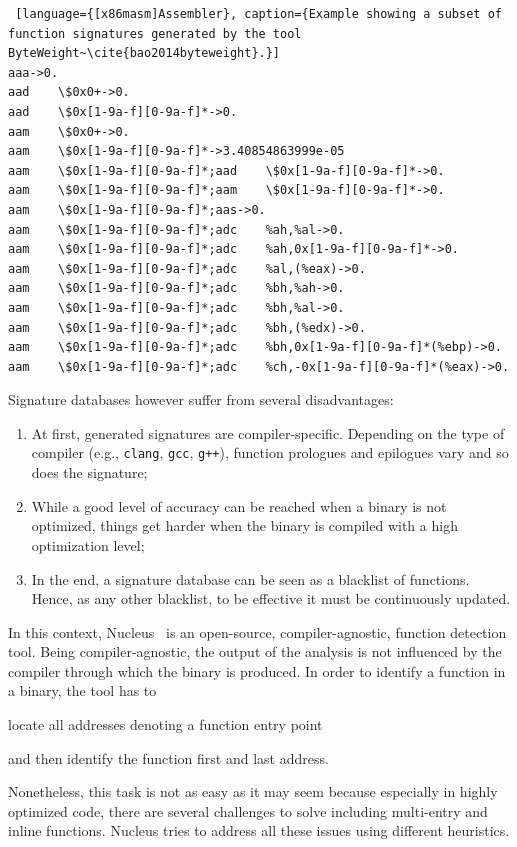 \documentclass[LaM,binding=0.6cm]{sapthesis}
\begin{document}
\begin{lstlisting} [language={[x86masm]Assembler}, caption={Example showing a subset of function signatures generated by the tool ByteWeight~\cite{bao2014byteweight}.}]
aaa->0.
aad    \$0x0+->0.
aad    \$0x[1-9a-f][0-9a-f]*->0.
aam    \$0x0+->0.
aam    \$0x[1-9a-f][0-9a-f]*->3.40854863999e-05
aam    \$0x[1-9a-f][0-9a-f]*;aad    \$0x[1-9a-f][0-9a-f]*->0.
aam    \$0x[1-9a-f][0-9a-f]*;aam    \$0x[1-9a-f][0-9a-f]*->0.
aam    \$0x[1-9a-f][0-9a-f]*;aas->0.
aam    \$0x[1-9a-f][0-9a-f]*;adc    %ah,%al->0.
aam    \$0x[1-9a-f][0-9a-f]*;adc    %ah,0x[1-9a-f][0-9a-f]*->0.
aam    \$0x[1-9a-f][0-9a-f]*;adc    %al,(%eax)->0.
aam    \$0x[1-9a-f][0-9a-f]*;adc    %bh,%ah->0.
aam    \$0x[1-9a-f][0-9a-f]*;adc    %bh,%al->0.
aam    \$0x[1-9a-f][0-9a-f]*;adc    %bh,(%edx)->0.
aam    \$0x[1-9a-f][0-9a-f]*;adc    %bh,0x[1-9a-f][0-9a-f]*(%ebp)->0.
aam    \$0x[1-9a-f][0-9a-f]*;adc    %ch,-0x[1-9a-f][0-9a-f]*(%eax)->0.
\end{lstlisting}

\noindent
Signature databases however suffer from several disadvantages:
\begin{enumerate}
\item At first, generated signatures are compiler-specific. Depending on the type of compiler (e.g., \texttt{clang}, \texttt{gcc}, \texttt{g++}), function prologues and epilogues vary and so does the signature;
\item While a good level of accuracy can be reached when a binary is not optimized, things get harder when the binary is compiled with a high optimization level;
\item In the end, a signature database can be seen as a blacklist of functions. Hence, as any other blacklist, to be effective it must be continuously updated.
\end{enumerate}
In this context, Nucleus~\cite{andriesse2017compiler} is an open-source, compiler-agnostic, function detection tool. Being compiler-agnostic, the output of the analysis is not influenced by the compiler through which the binary is produced. In order to identify a function in a binary, the tool has to 
\begin{enumerate*}[label=\roman*),itemjoin={,\quad}]
\item locate all addresses denoting a function entry point
\item and then identify the function first and last address.
\end{enumerate*}
Nonetheless, this task is not as easy as it may seem because especially in highly optimized code, there are several challenges to solve including multi-entry and inline functions. Nucleus tries to address all these issues using different heuristics.\\
\end{document}
